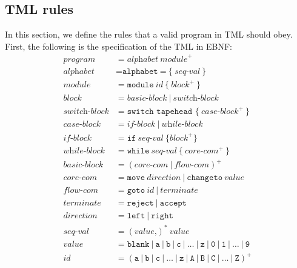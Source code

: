 \documentclass{article}
\theoremstyle{definition}
\theoremstyle{plain}
\begin{document}
    \subsection{TML rules}
    In this section, we define the rules that a valid program in TML should obey. First, the following is the specification of the TML in EBNF:
    \begin{align*}
        \textit{program} &= \textit{alphabet} \ \textit{module}^+ \\
        \textit{alphabet} &= \texttt{alphabet} \ \texttt{=} \ \texttt{\{} \ \textit{seq-val} \ \texttt{\}} \\
        \textit{module} &= \texttt{module} \ \textit{id} \ \texttt{\{} \ \textit{block}^+ \ \texttt{\}} \\
        \textit{block} &= \textit{basic-block} \ | \ \textit{switch-block} \\
        \textit{switch-block} &= \texttt{switch tapehead \{} \ \textit{case-block}^+ \ \texttt{\}} \\
        \textit{case-block} &= \textit{if-block} \ | \ \textit{while-block} \\
        \textit{if-block} &= \texttt{if} \ \textit{seq-val} \ \texttt{\{} \textit{block}^+ \texttt{\}} \\
        \textit{while-block} &= \texttt{while} \ \textit{seq-val} \ \texttt{\{} \ \textit{core-com}^+ \ \texttt{\}} \\
        \textit{basic-block} &= (\textit{core-com} \ | \ \textit{flow-com})^+ \\
        \textit{core-com} &= \texttt{move} \ \textit{direction} \ | \ \texttt{changeto} \ \textit{value} \\
        \textit{flow-com} &= \texttt{goto} \ \textit{id} \ | \ \textit{terminate} \\
        \textit{terminate} &= \texttt{reject} \ | \ \texttt{accept} \\
        \textit{direction} &= \texttt{left} \ | \ \texttt{right} \\
        \textit{seq-val} &= (\textit{value} \texttt{,})^* \ \textit{value} \\
        \textit{value} &= \texttt{blank} \ | \ \texttt{a} \ | \ \texttt{b} \ | \ \texttt{c} \ | \ \dots \ | \ \texttt{z} \ | \ \texttt{0} \ | \ \texttt{1} \ | \ \dots \ | \ \texttt{9} \\
        \textit{id} &= (\texttt{a} \ | \ \texttt{b} \ | \ \texttt{c} \ | \ \dots \ | \ \texttt{z} \ | \ \texttt{A} \ | \ \texttt{B} \ | \ \texttt{C} \ | \ \dots \ | \ \texttt{Z})^+
    \end{align*}
    
\end{document}
